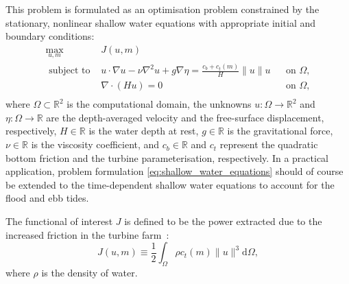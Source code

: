 \documentclass[prodmode,acmtoms]{acmsmall}
\begin{document}
This problem is formulated as an optimisation problem
constrained by the stationary, nonlinear shallow water equations with appropriate initial and boundary conditions:
\begin{equation}
\begin{aligned}
 \max_{u, m}~&J(u, m) \\
 \mbox{ subject to } & u \cdot \nabla  u - \nu \nabla^2  u  + g \nabla \eta  = \frac{c_b + c_t(m)}{H} \| u\|  u && \mbox{on } \Omega, \\
                    & \nabla \cdot \left(H u\right) = 0 && \mbox{on } \Omega,  \\
\label{eq:shallow_water_equations}
\end{aligned}
\end{equation}
where $\Omega \subset \mathbb R^2$ is the computational domain, the unknowns $u:\Omega \to \mathbb R^2$ and $\eta : \Omega \to \mathbb R$ are the depth-averaged velocity and the free-surface displacement, 
respectively, $H\in \mathbb R$ is the water depth at rest, $g\in \mathbb R$ is the gravitational force, $\nu \in \mathbb R$ is the viscosity coefficient, 
and $c_b \in \mathbb R$ and $c_t$ represent the quadratic bottom friction and the turbine parameterisation, respectively. In a practical
application, problem formulation \eqref{eq:shallow_water_equations} should of course be extended to the time-dependent shallow water equations to account for the
flood and ebb tides.

The functional of interest $J$ is defined to be the power extracted due to the increased friction in the turbine farm~\cite{ben2007,divett2011}:
\begin{equation}
J( u, m) \equiv \frac{1}{2}\int_{\Omega} \rho c_t(m) \|  u \|^3 \textrm{d} \Omega, \label{eq:functional_steady}
\end{equation}
where $\rho$ is the density of water.
\end{document}
